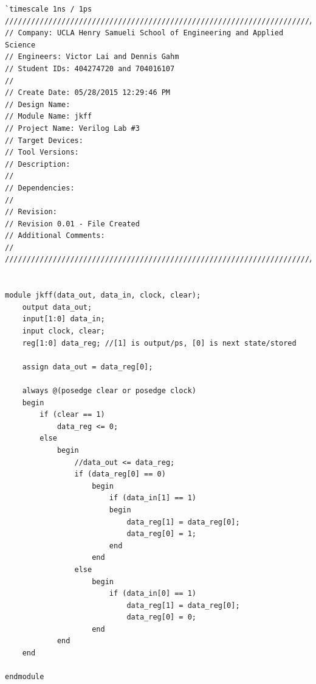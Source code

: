 \documentclass{article}
\begin{document}
\begin{verbatim}
`timescale 1ns / 1ps
/////////////////////////////////////////////////////////////////////////////
// Company: UCLA Henry Samueli School of Engineering and Applied Science
// Engineers: Victor Lai and Dennis Gahm
// Student IDs: 404274720 and 704016107 
// 
// Create Date: 05/28/2015 12:29:46 PM
// Design Name: 
// Module Name: jkff
// Project Name: Verilog Lab #3
// Target Devices: 
// Tool Versions: 
// Description: 
// 
// Dependencies: 
// 
// Revision:
// Revision 0.01 - File Created
// Additional Comments:
// 
/////////////////////////////////////////////////////////////////////////////


module jkff(data_out, data_in, clock, clear);
    output data_out;
    input[1:0] data_in;
    input clock, clear;
    reg[1:0] data_reg; //[1] is output/ps, [0] is next state/stored
    
    assign data_out = data_reg[0];
    
    always @(posedge clear or posedge clock)
    begin
        if (clear == 1)
            data_reg <= 0;
        else
            begin
                //data_out <= data_reg;
                if (data_reg[0] == 0)
                    begin
                        if (data_in[1] == 1)
                        begin
                            data_reg[1] = data_reg[0];
                            data_reg[0] = 1;
                        end
                    end
                else
                    begin
                        if (data_in[0] == 1)
                            data_reg[1] = data_reg[0];
                            data_reg[0] = 0;
                    end
            end 
    end

endmodule
\end{verbatim}

\end{document}
